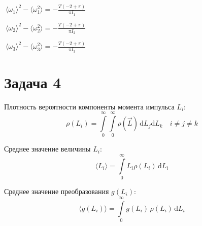 \documentclass[11pt]{article}
\begin{document}
    \(\displaystyle \
 \langle \omega_1 \rangle^2 - \langle \omega_1^2 \rangle = - \frac{T \left(-2 + \pi\right)}{\pi I_{1}}\)

    
    \(\displaystyle \
 \langle \omega_2 \rangle^2 - \langle \omega_2^2 \rangle = - \frac{T \left(-2 + \pi\right)}{\pi I_{2}}\)

    
    \(\displaystyle \
 \langle \omega_3 \rangle^2 - \langle \omega_3^2 \rangle = - \frac{T \left(-2 + \pi\right)}{\pi I_{3}}\)

    
    \hypertarget{ux437ux430ux434ux430ux447ux430-4}{%
\section{Задача 4}\label{ux437ux430ux434ux430ux447ux430-4}}

    Плотность вероятности компоненты момента импульса \(L_i\):
\[\rho(L_i) = \int \limits_0^\infty \!\!\! \int \limits_0^\infty \!
\rho(\vec L) \, \mathrm dL_j \mathrm dL_k \quad i \neq j \neq k\]

Среднее значение величины \(L_i\):
\[\langle L_i \rangle = \int \limits_0^\infty \! L_i \rho(L_i) \, \mathrm dL_i\]

Среднее значение преобразования \(g(L_i)\):
\[\langle g(L_i) \rangle = \int \limits_0^\infty \! g(L_i) \, \rho(L_i) \, \mathrm dL_i\]
\end{document}
